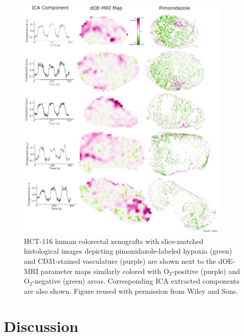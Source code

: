 \begin{figure}[htbp]
   \centering
   \includegraphics[width=0.9\textwidth]{oemri_thesis1/oemri_thesis1-images/fig7_hct116.pdf} %
   \caption{HCT-116 human colorectal xenografts with slice-matched histological images depicting pimonidazole-labeled hypoxia (green) and \acs{CD31}-stained vasculature (purple) are shown next to the \acs{dOE-MRI} parameter maps similarly colored with O$_2$-positive (purple) and O$_2$-negative (green) areas. Corresponding \acs{ICA} extracted components are also shown. Figure reused with permission from Wiley and Sons.
   \label{fig_hct116}}
\end{figure}


\section{Discussion}

